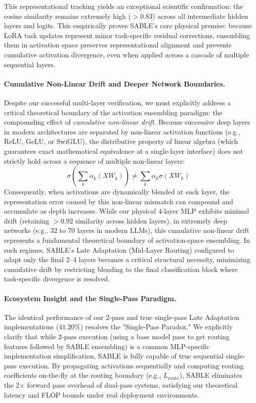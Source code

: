 This representational tracking yields an exceptional scientific confirmation: the cosine similarity remains extremely high (\textbf{$>0.83$}) across all intermediate hidden layers and logits. This empirically proves SABLE's core physical premise: because LoRA task updates represent minor task-specific residual corrections, ensembling them in activation space preserves representational alignment and prevents cumulative activation divergence, even when applied across a cascade of multiple sequential layers.

\paragraph{Cumulative Non-Linear Drift and Deeper Network Boundaries.} Despite our successful multi-layer verification, we must explicitly address a critical theoretical boundary of the activation ensembling paradigm: the compounding effect of \emph{cumulative non-linear drift}. Because successive deep layers in modern architectures are separated by non-linear activation functions (e.g., ReLU, GeLU, or SwiGLU), the distributive property of linear algebra (which guarantees exact mathematical equivalence at a single-layer interface) does not strictly hold across a sequence of multiple non-linear layers:
\begin{equation}
\sigma\left( \sum_k \alpha_k (X W_k) \right) \neq \sum_k \alpha_k \sigma(X W_k)
\end{equation}
Consequently, when activations are dynamically blended at each layer, the representation error caused by this non-linear mismatch can compound and accumulate as depth increases. While our physical 4-layer MLP exhibits minimal drift (retaining $>0.92$ similarity across hidden layers), in extremely deep networks (e.g., 32 to 70 layers in modern LLMs), this cumulative non-linear drift represents a fundamental theoretical boundary of activation-space ensembling. In such regimes, SABLE's Late Adaptation (Mid-Layer Routing) configured to adapt only the final 2--4 layers becomes a critical structural necessity, minimizing cumulative drift by restricting blending to the final classification block where task-specific divergence is resolved.

\paragraph{Ecosystem Insight and the Single-Pass Paradigm.} The identical performance of our 2-pass and true single-pass Late Adaptation implementations ($41.20\%$) resolves the "Single-Pass Paradox." We explicitly clarify that while 2-pass execution (using a base model pass to get routing features followed by SABLE ensembling) is a common MLP-specific implementation simplification, SABLE is fully capable of true sequential single-pass execution. By propagating activations sequentially and computing routing coefficients on-the-fly at the routing boundary (e.g., $L_{\text{route}}$), SABLE eliminates the 2$\times$ forward pass overhead of dual-pass systems, satisfying our theoretical latency and FLOP bounds under real deployment environments.

